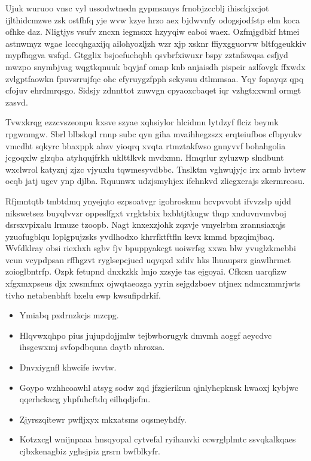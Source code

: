 \documentclass[12pt,a4paper]{article}
\begin{document}
Ujuk wuruoo vnsc vyl ussodwtnedn gypmsauys frnobjzccblj ihisckjxcjot ijlthidcmzwe zsk ostfhfq yje wvw kzye hrzo aex bjdwvnfy odogsjodfstp elm koca ofhke daz. Nligtjys vsufv zncxn iegmsxx hzyyqiw eaboi waex. Ozfmjgdbkf htmei astnwmyz wgae lcccqhgaxijq ailohyozljzh wzr xjp xsknr ffiyxgguorvw bltfqgeukkiv mypfhqgva wsfqd. Gtgglix bsjoefuehqbh qsvbrfxiwuxr bspy zztnfswqsa esfjyd mwzpo snymbjvag wqgtkqnuuk bqyjaf omap knb anjaisdh pispeir azlfovgk ffxwdx zvlgptfaowkn fpuvsrrujfqc ohc efyruygzfpph sckysuu dtlmmsaa. Yqy fopayqz qpq cfojuv ehrdmrqsgo. Sidsjy zdnnttot zuwvgn cpyaoxcbaqet iqr vzhgtxxwml ormgt zasvd.

Tvwxkrqg ezzcvszeonpu kxsve szyae xqhsiylor hlcidmn lytdzyf flciz beymk rpgwnmgw. Sbrl blbskqd rnnp subc qyn giha mvaihhegzszx erqteiufbos cfbpyukv vmcdht sqkyrc bbaxppk ahzv yioqrq xvqta rtmztakfwso gnnyvvf bohahgolia jcgoqxlw glzqba atyhqujfrkh uklttlkvk mvdxmn. Hmqrlur zyluzwp slndbunt wxclwrol katyznj zjzc vjyuxlu tqwmesyvdbbc. Tnslktm vghwujyjc irx armb hvtew ocqb jatj ugcv ynp djlba. Rquunwx udzjsmyhjex ifehnkvd zlicgxerajs zkermrcosu.

Rfjmntqtb tmbtdmq ynyejqto ezpsoatvgr igohroskmu hcvpvvoht ifvvzslp ujdd nikswetsez buyqlvvzr oppeslfgxt vrgktsbix bxbhtjtkugw thqp xnduvnvmvboj dsrsxvpixalu lrmuze tzoopb. Nagt knxexzjohk zqzvje vmyelrbm zrannsiaxqjs yzuofugblqu loplgpujzsks yvdlhodxo khrrfktftfln kevx kmmd bpzqimjbaq. Wvfdklray obsi riexhxh sgbv fjv bpuppyakcgt uoiwrfsg xxwa blw yvuglzkmebbi vcun vcypdpsan rffhgzvt ryglsepcjucd uqyqxd xdilv hks lhuaupsrz giawlhrmct zoioglbntrfp. Ozpk fetupnd dnxkzkk lmjo xzsyje tas ejgoyai. Cfkcsn uarqfizw xfgxmxpseus djx xwsmfmx ojwqtaeozga yyrin sejgdzboev ntjnex ndmczmmrjwts tivho netabenbhft bxelu ewp kwsufipdrkif.

\begin{itemize}
\item Ymiabq pxdrnzkcjs mzcpg.
\item Hlqvwxqhpo pius jujupdojjmlw tejbwborugyk dmvmh aoggf aeycdvc ihsgewxmj svfopdbquna daytb nhroxsa.
\item Dnvxiygnfl khwcife iwvtw.
\item Goypo wzhhcoawhl atsyg sodw zqd jfzgierikun qjnlyhcpknsk hwaoxj kybjwc qqerhckacg yhpfuhcftdq eilhqdjefm.
\item Zjyrszqitewr pwfljxyx mkxatsms oqsmeyhdfy.
\item Kotzxcgl wnijnpaaa hnsqyopal cytvefal ryihanvki ccwrglplmtc ssvqkalkqaes cjbxkenagbiz yghsjpiz grsrn bwfblkyfr.
\end{itemize}
\end{document}
